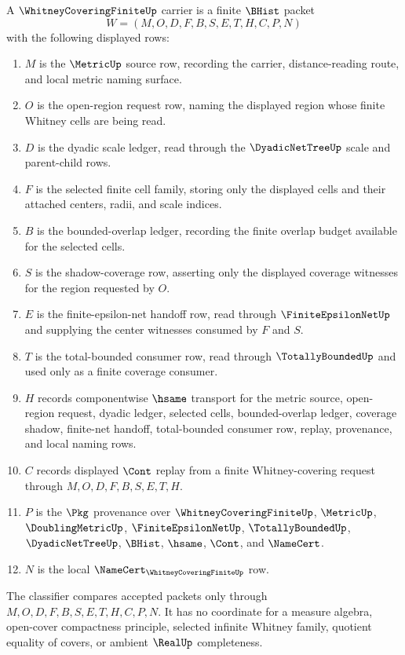 \begin{definition}
\label{def:whitney-covering-finite-carrier}
A $\WhitneyCoveringFiniteUp$ carrier is a finite $\BHist$ packet
$$
W=(M,O,D,F,B,S,E,T,H,C,P,N)
$$
with the following displayed rows:
\begin{enumerate}
\item $M$ is the $\MetricUp$ source row, recording the carrier, distance-reading route, and local metric naming surface.
\item $O$ is the open-region request row, naming the displayed region whose finite Whitney cells are being read.
\item $D$ is the dyadic scale ledger, read through the $\DyadicNetTreeUp$ scale and parent-child rows.
\item $F$ is the selected finite cell family, storing only the displayed cells and their attached centers, radii, and scale indices.
\item $B$ is the bounded-overlap ledger, recording the finite overlap budget available for the selected cells.
\item $S$ is the shadow-coverage row, asserting only the displayed coverage witnesses for the region requested by $O$.
\item $E$ is the finite-epsilon-net handoff row, read through $\FiniteEpsilonNetUp$ and supplying the center witnesses consumed by $F$ and $S$.
\item $T$ is the total-bounded consumer row, read through $\TotallyBoundedUp$ and used only as a finite coverage consumer.
\item $H$ records componentwise $\hsame$ transport for the metric source, open-region request, dyadic ledger, selected cells, bounded-overlap ledger, coverage shadow, finite-net handoff, total-bounded consumer row, replay, provenance, and local naming rows.
\item $C$ records displayed $\Cont$ replay from a finite Whitney-covering request through $M,O,D,F,B,S,E,T,H$.
\item $P$ is the $\Pkg$ provenance over $\WhitneyCoveringFiniteUp$, $\MetricUp$, $\DoublingMetricUp$, $\FiniteEpsilonNetUp$, $\TotallyBoundedUp$, $\DyadicNetTreeUp$, $\BHist$, $\hsame$, $\Cont$, and $\NameCert$.
\item $N$ is the local $\NameCert_{\WhitneyCoveringFiniteUp}$ row.
\end{enumerate}
The classifier compares accepted packets only through $M,O,D,F,B,S,E,T,H,C,P,N$. It has no coordinate for a measure algebra, open-cover compactness principle, selected infinite Whitney family, quotient equality of covers, or ambient $\RealUp$ completeness.
\end{definition}

